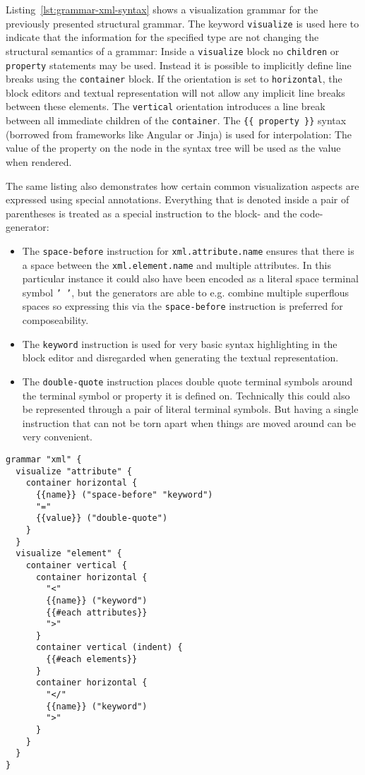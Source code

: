 \documentclass[sigconf,natbib=false]{acmart}
\begin{document}
Listing~\ref{lst:grammar-xml-syntax} shows a visualization grammar for the previously presented structural grammar. The keyword \texttt{visualize} is used here to indicate that the information for the specified type are not changing the structural semantics of a grammar: Inside a \texttt{visualize} block no \texttt{children} or \texttt{property} statements may be used. Instead it is possible to implicitly define line breaks using the \texttt{container} block. If the orientation is set to \texttt{horizontal}, the block editors and textual representation will not allow any implicit line breaks between these elements. The \texttt{vertical} orientation introduces a line break between all immediate children of the \texttt{container}. The \texttt{\{\{ property \}\}} syntax (borrowed from frameworks like Angular or Jinja) is used for interpolation: The value of the property on the node in the syntax tree will be used as the value when rendered.

The same listing also demonstrates how certain common visualization aspects are expressed using special annotations. Everything that is denoted inside a pair of parentheses is treated as a special instruction to the block- and the code-generator:
\begin{itemize}
\item The \texttt{space-before} instruction for \texttt{xml.attribute.name} ensures that there is a space between the \texttt{xml.element.name} and multiple attributes. In this particular instance it could also have been encoded as a literal space terminal symbol \texttt{'~'}, but the generators are able to e.g. combine multiple superflous spaces so expressing this via the \texttt{space-before} instruction is preferred for composeability.
\item The \texttt{keyword} instruction is used for very basic syntax highlighting in the block editor and disregarded when generating the textual representation.
\item The \texttt{double-quote} instruction places double quote terminal symbols around the terminal symbol or property it is defined on. Technically this could also be represented through a pair of literal terminal symbols. But having a single instruction that can not be torn apart when things are moved around can be very convenient.
\end{itemize}

\begin{lstlisting}[float,caption={Syntactic structure of \texttt{XML}}, label=lst:grammar-xml-syntax]
grammar "xml" {
  visualize "attribute" {
    container horizontal {
      {{name}} ("space-before" "keyword")
      "="
      {{value}} ("double-quote")
    }
  }
  visualize "element" {
    container vertical {
      container horizontal {
        "<"
        {{name}} ("keyword")
        {{#each attributes}}
        ">"
      }
      container vertical (indent) {
        {{#each elements}}
      }
      container horizontal {
        "</"
        {{name}} ("keyword")
        ">"
      }
    }
  }
}
\end{lstlisting}
\end{document}
